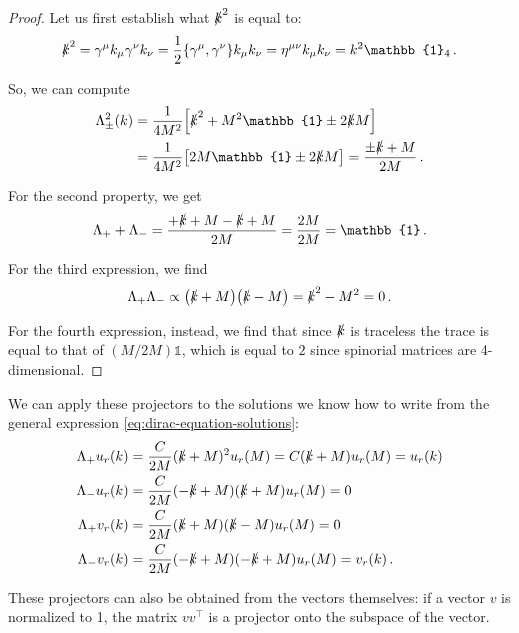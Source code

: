 \documentclass[main.tex]{subfiles}
\begin{document}
\begin{proof}
Let us first establish what \(\slashed{k}^2\) is equal to: 
%
\begin{align}
\slashed{k}^2 =
\gamma^{\mu } k_{\mu } \gamma^{\nu } k_{\nu }
= \frac{1}{2} \qty{\gamma^{\mu }, \gamma^{\nu }}k_{\mu } k_{\nu }
= \eta^{\mu \nu } k_{\mu } k_{\nu }
= k^2 \mathbb{1}_{4}
\,.
\end{align}

So, we can compute 
%
\begin{align}
\Lambda_{\pm}^2 (k) &= \frac{1}{4 M^2}\qty[\slashed{k}^2 + M^2 \mathbb{1} \pm 2 \slashed{k} M]  \\
&= \frac{1}{4 M^2} \qty[2 M \mathbb{1} \pm 2 \slashed{k}M] = \frac{\pm \slashed{k} + M}{2M}
\,.
\end{align}

For the second property, we get 
%
\begin{align}
\Lambda_{+} + \Lambda_{-} = \frac{+ \slashed{k} + M - \slashed{k} + M}{2M} = \frac{2M}{2M} = \mathbb{1} 
\,.
\end{align}

For the third expression, we find 
%
\begin{align}
\Lambda_{+} \Lambda_{-} \propto \qty(\slashed{k} + M) \qty(\slashed{k} - M) = \slashed{k}^2 - M^2 = 0
\,.
\end{align}

For the fourth expression, instead, we find that since \(\slashed{k}\) is traceless the trace is equal to that of \((M / 2 M)  \mathbb{1}\), which is equal to \(2\) since spinorial matrices are 4-dimensional.
\end{proof}

We can apply these projectors to the solutions we know how to write from the general expression \eqref{eq:dirac-equation-solutions}: 
%
\begin{align}
\Lambda_{+} u_r (k) &= \frac{C}{2M} (\slashed{k} + M)^2 u_r(M) = C(\slashed{k} + M) u_r (M) = u_r(k) \\
\Lambda_{-} u_r (k) &= \frac{C}{2M} (-\slashed{k} + M) (\slashed{k} + M) u_r(M) = 0 \\
\Lambda_{+} v_r (k) &= \frac{C}{2M} (\slashed{k} + M) (\slashed{k} - M) u_r(M) = 0 \\
\Lambda_{-} v_r (k) &= \frac{C}{2M} (-\slashed{k} + M) (-\slashed{k} + M) u_r(M) = v_r(k)
\,.
\end{align}

These projectors can also be obtained from the vectors themselves: if a vector \(v\) is normalized to 1, the matrix \(v v ^{\top}\) is a projector onto the subspace of the vector.
\end{document}
